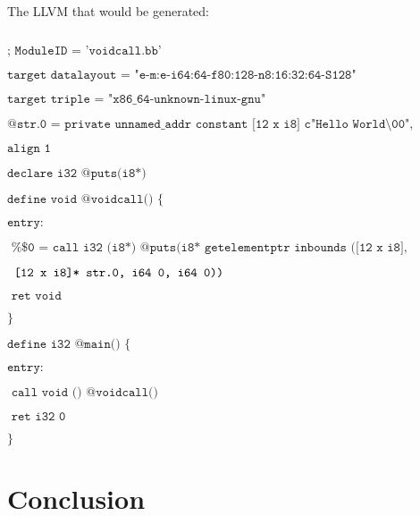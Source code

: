 \documentclass[journal=jacsat, manuscript=article]{achemso}
\begin{document}
The LLVM that would be generated:

$\texttt{}$


$\texttt{; ModuleID = 'voidcall.bb'}$

$\texttt{target datalayout = "e-m:e-i64:64-f80:128-n8:16:32:64-S128"}$

$\texttt{target triple = "x86\_64-unknown-linux-gnu"}$

$\texttt{@str.0 = private unnamed\_addr constant [12 x i8] c"Hello World\textbackslash00",}$

$\texttt{align 1}$

$\texttt{declare i32 @puts(i8*)}$

$\texttt{define void @voidcall() \{}$

$\texttt{entry:}$

$\texttt{  \%\$0 = call i32 (i8*) @puts(i8* getelementptr inbounds ([12 x i8], }$

$\texttt{  [12 x i8]* \@str.0, i64 0, i64 0)) }$

$\texttt{  ret void}$

$\texttt{\}}$

$\texttt{define i32 @main() \{}$

$\texttt{entry:}$

$\texttt{  call void () @voidcall()}$

$\texttt{  ret i32 0}$

$\texttt{\}}$

\section{Conclusion}
\end{document}
